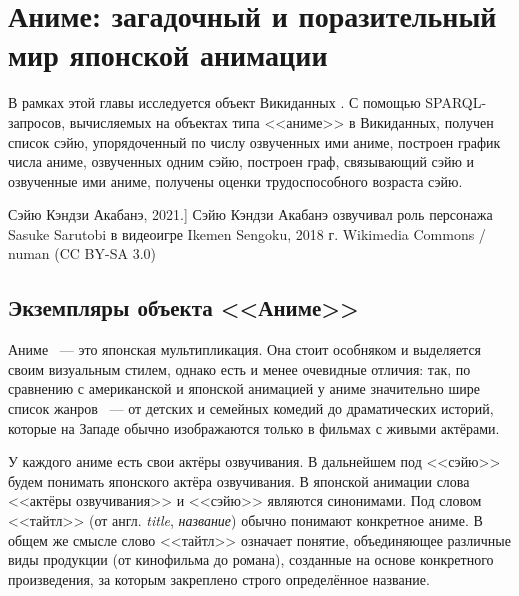 
\chapter{Аниме: загадочный и поразительный мир японской анимации}


В рамках этой главы исследуется объект Викиданных . С помощью SPARQL-запросов, вычисляемых на объектах типа <<аниме>> в Викиданных, получен список сэйю, упорядоченный по числу озвученных ими аниме, построен график числа аниме, озвученных одним сэйю, построен граф, связывающий сэйю и озвученные ими аниме, получены оценки трудоспособного возраста сэйю. 

\begin{marginfigure}[0.0cm]
{
	\setlength{\fboxsep}{0pt}%
	\setlength{\fboxrule}{1pt}%
}
\caption
[Сэйю Кэндзи Акабанэ, 2021.]
{
Сэйю Кэндзи Акабанэ озвучивал роль персонажа Sasuke Sarutobi в видеоигре Ikemen Sengoku, 2018 г.\newline
Wikimedia Commons / numan (CC BY-SA 3.0)
}
\label{fig:seiyu}
\end{marginfigure}

\label{ch:anime}

\section{Экземпляры объекта <<Аниме>>}

Аниме ~--- это японская мультипликация. Она стоит особняком и выделяется своим визуальным стилем, однако есть и менее очевидные отличия: так, по сравнению с американской и японской анимацией у аниме значительно шире список жанров ~--- от детских и семейных комедий до драматических историй, которые на Западе обычно изображаются только в фильмах с живыми актёрами.

У каждого аниме есть свои актёры озвучивания. В дальнейшем под <<сэйю>> будем понимать японского актёра озвучивания. В японской анимации слова <<актёры озвучивания>> и <<сэйю>> являются синонимами. Под словом <<тайтл>> (от англ. \emph{title}, \emph{название}) обычно понимают конкретное аниме. В общем же смысле слово <<тайтл>> означает понятие, объединяющее различные виды продукции (от кинофильма до романа), созданные на основе конкретного произведения, за которым закреплено строго определённое название.

